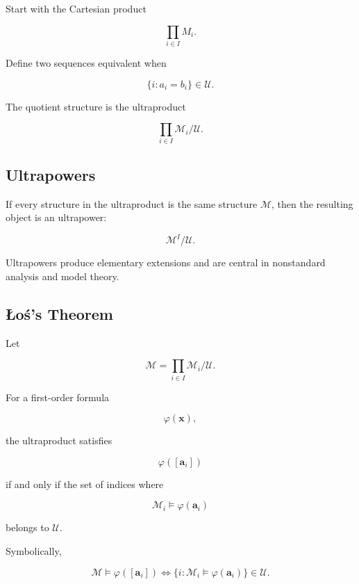 Start with the Cartesian product

\[
\prod_{i\in I}M_i.
\]

Define two sequences equivalent when

\[
\boxed{
\{
i:
a_i=b_i
\}
\in\mathcal{U}.
}
\]

The quotient structure is the ultraproduct

\[
\boxed{
\prod_{i\in I}
\mathcal{M}_i
/
\mathcal{U}.
}
\]

\subsection{Ultrapowers}
\label{subsec:ultrapowers}

If every structure in the ultraproduct is the same structure
\(\mathcal{M}\), then the resulting object is an ultrapower:

\[
\boxed{
\mathcal{M}^I/\mathcal{U}.
}
\]

Ultrapowers produce elementary extensions and are central in nonstandard
analysis and model theory.

\subsection{Łoś's Theorem}
\label{subsec:los-theorem}

\begin{theorem}
Let

\[
\mathcal{M}
=
\prod_{i\in I}
\mathcal{M}_i/\mathcal{U}.
\]

For a first-order formula

\[
\varphi(\mathbf{x}),
\]

the ultraproduct satisfies

\[
\varphi([\mathbf{a}_i])
\]

if and only if the set of indices where

\[
\mathcal{M}_i\models\varphi(\mathbf{a}_i)
\]

belongs to \(\mathcal{U}\).
\end{theorem}

Symbolically,

\[
\boxed{
\mathcal{M}
\models
\varphi([\mathbf{a}_i])
\iff
\{
i:
\mathcal{M}_i\models\varphi(\mathbf{a}_i)
\}
\in\mathcal{U}.
}
\]

